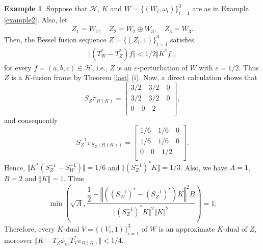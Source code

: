 \documentclass{birkjour}
\theoremstyle{definition}
\newtheorem{ex}[thm]{Example}
\theoremstyle{remark}
\numberwithin{equation}{section}
\begin{document}
\begin{ex}
Suppose that $\mathcal{H}$, $K$ and  $W=\lbrace (W_{i},
\omega_{i})\rbrace_{i=1}^{3}$  are as in Example \ref{example2}. Also, let
\begin{eqnarray*}
Z_{1}=W_{1}, \quad Z_{2}=W_{2}\oplus W_{3}, \quad Z_{3}=W_{3}.
\end{eqnarray*}
Then, the Bessel fusion  sequence $Z  = \{(Z_{i},1) \}_{i=1}^{3}$ satisfies
\begin{eqnarray*}
\Vert
(T^{*}_{W}-T^{*}_{Z})f\Vert   < 1/2  \Vert K^{*}f\Vert,
\end{eqnarray*}
for every $f=(a,b, c)\in \mathcal{H}$, i.e., $Z$ is an $\varepsilon$-perturbation of $W$ with $\varepsilon  = 1/2$. Thus $Z$ is a $K$-fusion frame by Theorem \ref{last} (i). Now, a direct calculation shows that
\begin{equation*}
S_{Z}\pi_{R(K)} = \left[
 \begin{array}{ccc}

3/2 \quad 3/2 \quad 0\\

3/2 \quad 3/2 \quad 0\\

0 \quad 0 \quad 2\\

\end{array} \right],
\end{equation*}
and consequently
\begin{equation*}
S_{Z}^{-1}\pi_{S_{Z}(R(K))} = \left[
 \begin{array}{ccc}

1/6 \quad 1/6 \quad 0\\

1/6 \quad 1/6 \quad 0\\

0 \quad 0 \quad 1/2\\

\end{array} \right].
\end{equation*}
Hence, $\Vert K^{*}(S_{Z}^{-1}-S_{W}^{-1})\Vert =1/6$ and $\Vert (S_{Z}^{-1})^{*}K\Vert = 1/3$. Also, we have $A=1$, $B=2$ and $\Vert K\Vert=1$. Thus
\begin{eqnarray*}
\min \left( \sqrt{A}, \dfrac{\dfrac{1}{2} -\left\Vert \left((S_{W}^{-1})^{*}-(S_{Z}^{-1})^{*}\right)K\right\Vert^{2}B}{\Vert (S_{Z}^{-1})^{*}K\Vert^{2}\Vert K\Vert^{2}} \right) = 1.
\end{eqnarray*}
Therefore,  every $K$-dual  $V=\lbrace (V_{i},
1)\rbrace_{i=1}^{3}$  of $W$ is an approximate $K$-dual of $Z$, moreover $\Vert K -  T_{Z}\phi_{vz}T^{*}_{V}\pi_{R(K)} \Vert < 1/4$.
\end{ex}
\end{document}
